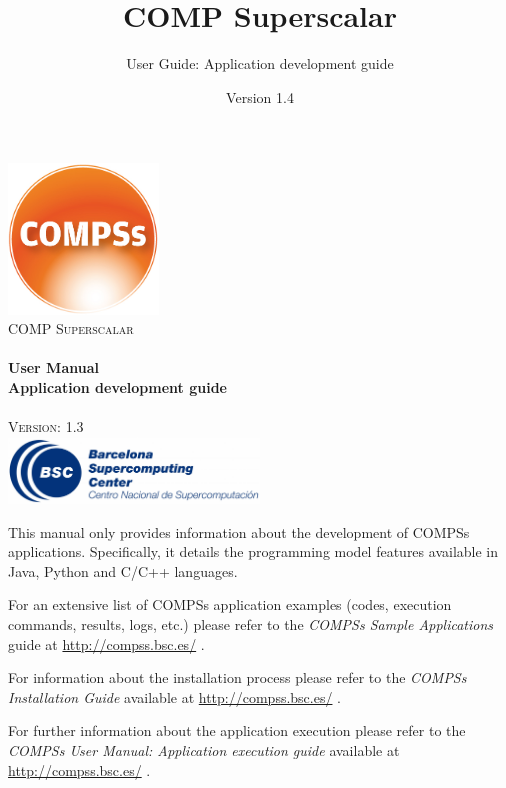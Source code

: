 \documentclass[a4paper,12pt]{article}
\title{COMP Superscalar}
\author{User Guide: Application development guide}
\date{Version 1.4}
\begin{document}
  \hypersetup{pageanchor=false}
  \begin{titlepage} 
    \begin{center} 
      \includegraphics[width=0.3\textwidth]{./Figures/Logos/degradado-naranja-compss.jpg}~\\[1cm] 
      \textsc{\LARGE COMP Superscalar}\\[1.5cm] 
      
      \HRule \\[0.4cm] 
      { \huge \bfseries User Manual \\[0.4cm] }
      { \large \bfseries Application development guide \\[0.4cm] } 
      \HRule \\[1.5cm] 

      { \large \textsc{Version: 1.3 }} \\[0.3cm]
      
      \vfill 
      \includegraphics[width=0.5\textwidth]{./Figures/bsc_280.jpg}~\\[1cm]
    \end{center} 
  \end{titlepage}
  \hypersetup{pageanchor=true}
  
  {
    This manual only provides information about the development of COMPSs applications. Specifically, it details
    the programming model features available in Java, Python and C/C++ languages. 
    \newline
    
    For an extensive list of COMPSs application examples (codes, execution commands, results, logs, etc.) please refer to the \textit{COMPSs Sample 
    Applications} guide at \url{http://compss.bsc.es/} .
    \newline
    
    For information about the installation process please refer to the \textit{COMPSs Installation Guide} available at
    \url{http://compss.bsc.es/} .
    \newline
    
    For further information about the application execution please refer to the \textit{COMPSs User Manual: Application execution 
    guide} available at \url{http://compss.bsc.es/} .
    \newline
  }
  
\end{document}
